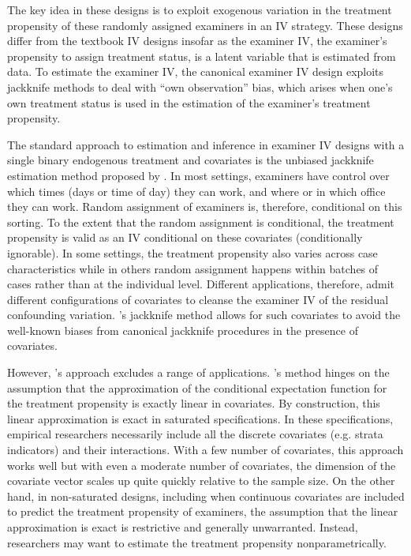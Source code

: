 The key idea in these designs is to exploit exogenous variation in the treatment propensity of these randomly assigned examiners in an IV strategy. These designs differ from the textbook IV designs insofar as the examiner IV, the examiner’s propensity to assign treatment status, is a latent variable that is estimated from data. To estimate the examiner IV, the canonical examiner IV design exploits jackknife methods to deal with “own observation” bias, which arises when one's own treatment status is used in the estimation of the examiner's treatment propensity. 

The standard approach to estimation and inference in examiner IV designs with a single binary endogenous treatment and covariates is the unbiased jackknife estimation method proposed by \citet{kolesarcowles}.  In most settings, examiners have control over which times (days or time of day) they can work, and where or in which office they can work. Random assignment of examiners is, therefore, conditional on this sorting. To the extent that the random assignment is conditional, the treatment propensity is valid as an IV conditional on these covariates (conditionally ignorable). In some settings, the treatment propensity also varies across case characteristics while in others random assignment happens within batches of cases rather than at the individual level. Different applications, therefore, admit different configurations of covariates to cleanse the examiner IV of the residual confounding variation. \citet{kolesarcowles}'s jackknife method allows for such covariates to avoid the well-known biases from canonical jackknife procedures in the presence of covariates. 

However, \citet{kolesarcowles}'s approach excludes a range of applications. \citet{kolesarcowles}'s method hinges on the assumption that the approximation of the conditional expectation function for the treatment propensity is exactly linear in covariates. By construction,  this linear approximation is exact in saturated specifications. In these specifications, empirical researchers necessarily include all the discrete covariates (e.g. strata indicators) and their interactions. With a few number of covariates, this approach works well but with even a moderate number of covariates, the dimension of the covariate vector scales up quite quickly relative to the sample size. On the other hand, in non-saturated designs, including when continuous covariates are included to predict the treatment propensity of examiners, the assumption that the linear approximation is exact is restrictive and generally unwarranted. Instead, researchers may want to estimate the treatment propensity nonparametrically.  

